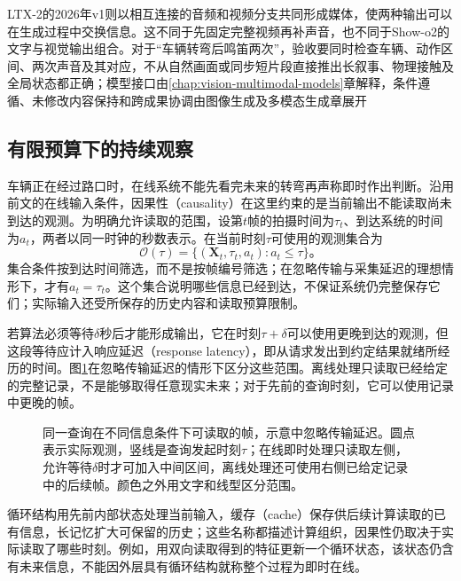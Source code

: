LTX-2的2026年v1则以相互连接的音频和视频分支共同形成媒体，使两种输出可以在生成过程中交换信息。这不同于先固定完整视频再补声音，也不同于Show-o2的文字与视觉输出组合。对于“车辆转弯后鸣笛两次”，验收要同时检查车辆、动作区间、两次声音及其对应，不从自然画面或同步短片段直接推出长叙事、物理接触及全局状态都正确；模型接口由\ref{chap:vision-multimodal-models}章解释，条件遵循、未修改内容保持和跨成果协调由图像生成及多模态生成章展开

\subsection{有限预算下的持续观察}
\label{sec:vision-overview-streaming-frontier}

车辆正在经过路口时，在线系统不能先看完未来的转弯再声称即时作出判断。沿用前文的在线输入条件，因果性（causality）在这里约束的是当前输出不能读取尚未到达的观测。为明确允许读取的范围，设第$t$帧的拍摄时间为$\tau_t$、到达系统的时间为$a_t$，两者以同一时钟的秒数表示。在当前时刻$\tau$可使用的观测集合为
\begin{equation}
  \mathcal{O}(\tau)
  =\{(\bm{X}_t,\tau_t,a_t):a_t\leq\tau\}\text{。}
  \label{eq:vision-causal-observations}
\end{equation}
集合条件按到达时间筛选，而不是按帧编号筛选；在忽略传输与采集延迟的理想情形下，才有$a_t=\tau_t$。这个集合说明哪些信息已经到达，不保证系统仍完整保存它们；实际输入还受所保存的历史内容和读取预算限制。

若算法必须等待$\delta$秒后才能形成输出，它在时刻$\tau+\delta$可以使用更晚到达的观测，但这段等待应计入响应延迟（response latency），即从请求发出到约定结果就绪所经历的时间。图\ref{fig:vision-observation-window}在忽略传输延迟的情形下区分这些范围。离线处理只读取已经给定的完整记录，不是能够取得任意现实未来；对于先前的查询时刻，它可以使用记录中更晚的帧。

\begin{figure}[htbp]
  \centering
  
  \caption{同一查询在不同信息条件下可读取的帧，示意中忽略传输延迟。圆点表示实际观测，竖线是查询发起时刻$\tau$；在线即时处理只读取左侧，允许等待$\delta$时才可加入中间区间，离线处理还可使用右侧已给定记录中的后续帧。颜色之外用文字和线型区分范围。}
  \label{fig:vision-observation-window}
\end{figure}

循环结构用先前内部状态处理当前输入，缓存（cache）保存供后续计算读取的已有信息，长记忆扩大可保留的历史；这些名称都描述计算组织，因果性仍取决于实际读取了哪些时刻。例如，用双向读取得到的特征更新一个循环状态，该状态仍含有未来信息，不能因外层具有循环结构就称整个过程为即时在线。

